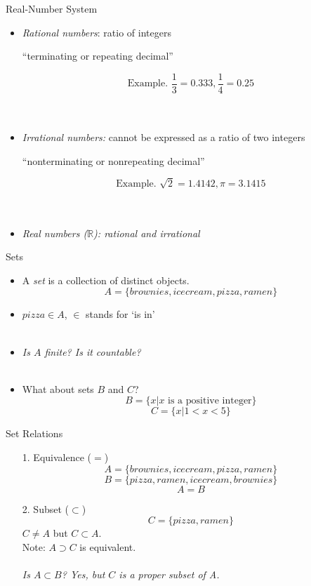 \documentclass{./../../Latex/teaching_slides}
\begin{document}
\begin{frame}{Real-Number System}
\vspace{-0.15em} 
\begin{itemize}
\item \textit{Rational numbers}: ratio of integers 
\item[] \hspace{0.5em} ``terminating or repeating decimal''
\vspace{-0.15em} 
\item[] $$\text{Example. } \frac{1}{3}=0.333, \frac{1}{4}=0.25$$ \\~\\
\vspace{-0.15em} 
\item \pause \textit{Irrational numbers:} cannot be expressed as a ratio of two integers
\item[] \hspace{0.5em} ``nonterminating or nonrepeating decimal'' 
\vspace{-0.15em} 
\item[] $$\text{Example. } \sqrt{2}=1.4142, \pi=3.1415$$ \\~\\
\vspace{-0.15em} 
\item \pause \textit{Real numbers ($\mathbb{R}$): rational and irrational}
\end{itemize}
\end{frame}


\begin{frame}{Sets}
\begin{itemize}
\item A \textit{set} is a collection of distinct objects.
$$ A = \{brownies, icecream, pizza, ramen\} $$
\item $pizza \in A$, $\in$ stands for `is in' \\~\\
\item \textit{Is $A$ finite? Is it countable?} \\~\\
\item \pause What about sets $B$ and $C$?
$$ B = \{x | x \text{ is a positive integer}\}$$
$$ C = \{x | 1<x<5\}$$
\end{itemize}
\end{frame}

\begin{frame}{Set Relations}
\begin{itemize}
\item[1.] Equivalence ($=$)
$$ A = \{brownies, icecream, pizza, ramen\} $$
$$ B = \{pizza, ramen, icecream, brownies\} $$
$$ A = B $$
\item[2.] \pause Subset ($\subset$)
$$ C = \{pizza, ramen\} $$
$ C \neq A$ but $ C \subset A$. \\ Note: $A \supset C$ is equivalent. \\~\\
\pause \textit{Is $A \subset B$? \pause Yes, but $C$ is a proper subset of A.}
\end{itemize}
\end{frame}
\end{document}
